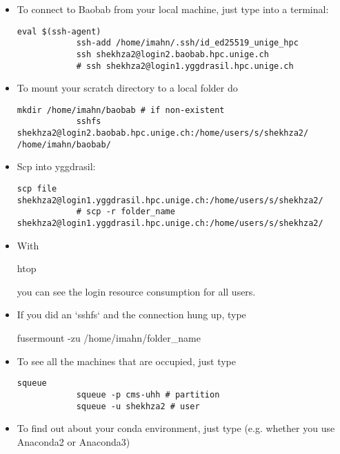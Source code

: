 \documentclass[12pt, a4paper]{article}
\numberwithin{equation}{section}
\theoremstyle{definition}
\theoremstyle{definition}
\begin{document}
	\begin{itemize}
		\item To connect to Baobab from your local machine, just type into a terminal: 
		\begin{lstlisting}[style=mystylebash, label=alg:eval, caption=ssh, xleftmargin=\parindent]
			eval $(ssh-agent)
			ssh-add /home/imahn/.ssh/id_ed25519_unige_hpc
			ssh shekhza2@login2.baobab.hpc.unige.ch 
			# ssh shekhza2@login1.yggdrasil.hpc.unige.ch
		\end{lstlisting} 
		
		\item To mount your scratch directory to a local folder do
		\begin{lstlisting}[style=mystylepython, label=alg:sshfs, caption=Local mounting, xleftmargin=\parindent]
			mkdir /home/imahn/baobab # if non-existent
			sshfs shekhza2@login2.baobab.hpc.unige.ch:/home/users/s/shekhza2/ /home/imahn/baobab/
		\end{lstlisting} 
		
		\item Scp into yggdrasil: 
		\begin{lstlisting}[style=mystylebash, label=alg:scp, caption=Scp file (folder) onto cluster, xleftmargin=\parindent]
			scp file shekhza2@login1.yggdrasil.hpc.unige.ch:/home/users/s/shekhza2/
			# scp -r folder_name shekhza2@login1.yggdrasil.hpc.unige.ch:/home/users/s/shekhza2/
		\end{lstlisting}
		
		\item With 
		\begin{center}
			htop 
		\end{center}
		you can see the login resource consumption for all users. 
		
		\item If you did an `sshfs` and the connection hung up, type 
		\begin{center}
			fusermount -zu /home/imahn/folder\_name
		\end{center}
		
		\item To see all the machines that are occupied, just type 
		\begin{lstlisting}[style=mystylebash, label=alg:squeue, caption=Squeue commands, xleftmargin=\parindent]
			squeue
			squeue -p cms-uhh # partition
			squeue -u shekhza2 # user
		\end{lstlisting}
		
		\item To find out about your conda environment, just type (e.g. whether you use Anaconda2 or Anaconda3)
		

\end{itemize}
\end{document}
